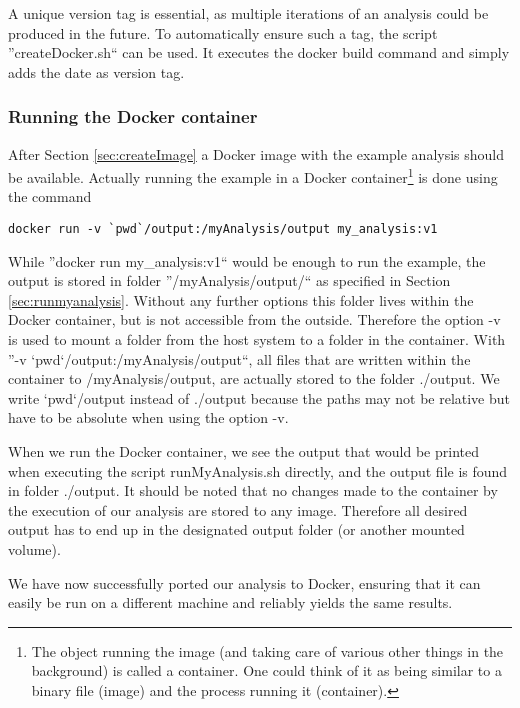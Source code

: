 \documentclass[a4paper, twoside, 11pt]{article}
\begin{document}
A unique version tag is essential, as multiple iterations of an analysis could be produced in the future. 
To automatically ensure such a tag, the script ''createDocker.sh`` can be used.
It executes the docker build command and simply adds the date as version tag. 


\subsubsection{Running the Docker container}
\label{sec:runContainer}

After Section \ref{sec:createImage} a Docker image with the example analysis should be available. 
Actually running the example in a Docker container\footnote{The object running the image 
(and taking care of various other things in the background) is called a container. 
One could think of it as being similar to a binary file (image) and the process running it (container).} 
is done using the command 
\begin{lstlisting}[basicstyle=\footnotesize\ttfamily,frame=single]
docker run -v `pwd`/output:/myAnalysis/output my_analysis:v1
\end{lstlisting}

While ''docker run my\_analysis:v1``
would be enough to run the example, the output is stored in folder 
''/myAnalysis/output/`` as specified in Section \ref{sec:runmyanalysis}.
Without any further options this folder lives within the Docker container, but is not accessible from the outside. 
Therefore the option -v is used to mount a folder from the host system to a folder in the container. 
With ''-v `pwd`/output:/myAnalysis/output``, all files that are written within the container to /myAnalysis/output, 
are actually stored to the folder ./output. 
We write `pwd`/output instead of ./output because the 
paths may not be relative but have to be absolute when using the option -v. 

When we run the Docker container, we see the output that would be printed when 
executing the script runMyAnalysis.sh directly, and the output file is found in folder ./output. 
It should be noted that no changes made to the container by the execution of our analysis 
are stored to any image. 
Therefore all desired output has to end up in the designated output folder (or another mounted volume). 

We have now successfully ported our analysis to Docker, ensuring that it can easily be run  
on a different machine and reliably yields the same results. 
\end{document}
